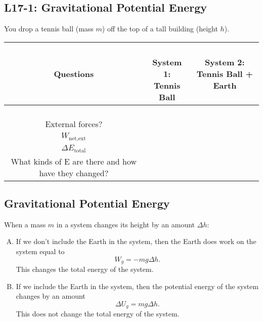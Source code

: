 \documentclass[]{article}
\newcommand{\Week}{17}
\begin{document}
\begin{PresentSpace}
\vspace{-10pt}
\section*{L\Week-1: Gravitational Potential Energy}
\vspace{-10pt}
You drop a tennis ball (mass $m$) off the top of a tall building (height $h$).
\begin{center}
\begin{tabular}{|c|c|c|}
	\hline
	Questions & \parbox{2.5cm}{\centering \phantom{\tiny Blank} \\ System 1: \\ Tennis Ball \small \\ \phantom{Blank}} & \parbox{4.5cm}{\centering System 2: \\ Tennis Ball + Earth} \\
	\hline\hline
	\parbox{4cm}{\centering\phantom{\small Blank} \\ External forces? \small \\ \phantom{Blank}} & & \\ \hline
	\parbox{4cm}{\centering\phantom{\small Blank} \\ $W_{\text{net,ext}}$ \small \\ \phantom{Blank}} & & \\ \hline
	\parbox{4cm}{\centering\phantom{\small Blank} \\ $\Delta E_{\text{total}}$ \small \\ \phantom{Blank}} & & \\ \hline
	\parbox{4cm}{\centering\vspace{6pt} What kinds of E are there and how have they changed?\vspace{6pt}} & & \\ \hline
\end{tabular}
\end{center}
\end{PresentSpace}
\newpage
\begin{TeacherMargin}

\end{TeacherMargin}
\begin{PresentSpace}
\vspace{-10pt}
\section*{Gravitational Potential Energy}
\vspace{-10pt}
When a mass $m$ in a system changes its height by an amount $\Delta h$:
\begin{enumerate}[(A)]
	\item If we don't include the Earth in the system, then the Earth does work on the system equal to
	\[
	W_{g} = -mg\Delta h.
	\]
	This changes the total energy of the system.
	\item If we include the Earth in the system, then the potential energy of the system changes by an amount
	\[
	\Delta U_{g} = mg\Delta h.
	\]
	This does not change the total energy of the system.
\end{enumerate}
\end{PresentSpace}
\end{document}
